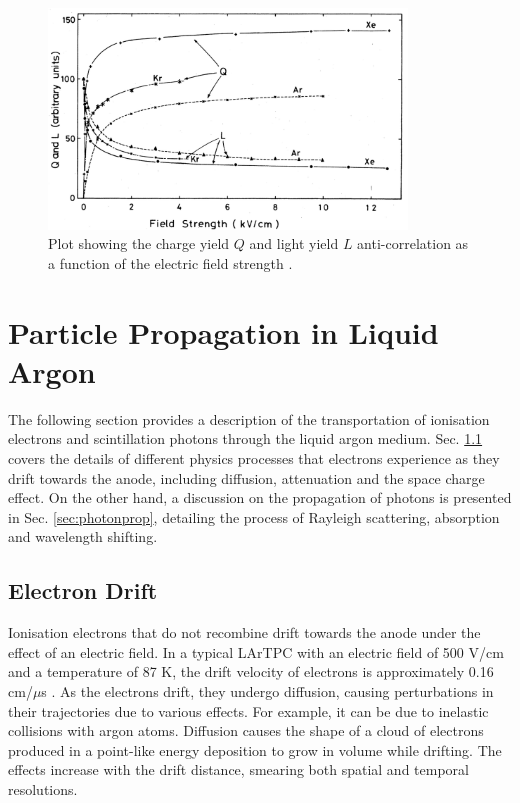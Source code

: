 \begin{figure}[ht!] 
\centering    
\includegraphics[width=0.85\textwidth]{QLAnti}
\caption[QLAnti]{
Plot showing the charge yield $Q$ and light yield $L$ anti-correlation as a function of the electric field strength \cite{QLAnti}.
}
\label{fig:QLAnti}
\end{figure}

\section{Particle Propagation in Liquid Argon}
\label{sec3:propagation}

The following section provides a description of the transportation of ionisation electrons and scintillation photons through the liquid argon medium.
Sec. \ref{sec:edrift} covers the details of different physics processes that electrons experience as they drift towards the anode, including diffusion, attenuation and the space charge effect.
On the other hand, a discussion on the propagation of photons is presented in Sec. \ref{sec:photonprop}, detailing the process of Rayleigh scattering, absorption and wavelength shifting.

\subsection{Electron Drift}
\label{sec:edrift}


Ionisation electrons that do not recombine drift towards the anode under the effect of an electric field.
In a typical LArTPC with an electric field of 500 V/cm and a temperature of 87 K, the drift velocity of electrons is approximately 0.16 cm/$\mu$s \cite{drift_vel}.
As the electrons drift, they undergo diffusion, causing perturbations in their trajectories due to various effects.
For example, it can be due to inelastic collisions with argon atoms.
Diffusion causes the shape of a cloud of electrons produced in a point-like energy deposition to grow in volume while drifting.
The effects increase with the drift distance, smearing both spatial and temporal resolutions. 

